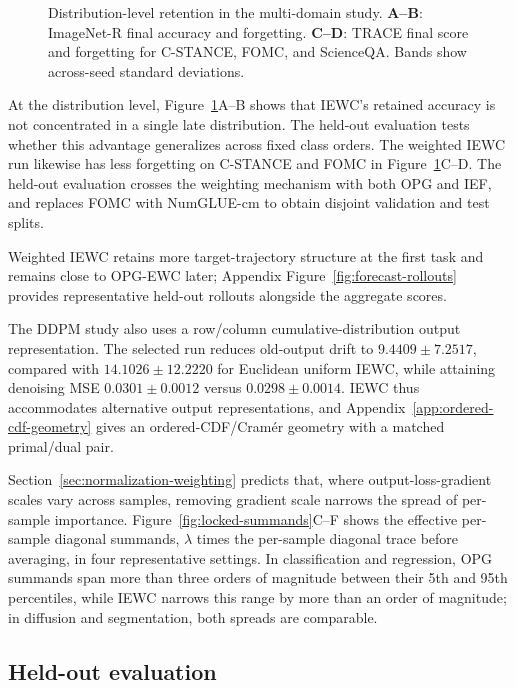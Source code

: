 \begin{figure}[t]
\centering

\caption[ImageNet-R and TRACE distribution retention]{Distribution-level retention in the multi-domain study. \textbf{A--B}: ImageNet-R final accuracy and forgetting. \textbf{C--D}: TRACE final score and forgetting for C-STANCE, FOMC, and ScienceQA. Bands show across-seed standard deviations.}
\label{fig:distribution-retention}
\end{figure}

At the distribution level, Figure~\ref{fig:distribution-retention}A--B shows that IEWC's retained accuracy is not concentrated in a single late distribution. The held-out evaluation tests whether this advantage generalizes across fixed class orders. The weighted IEWC run likewise has less forgetting on C-STANCE and FOMC in Figure~\ref{fig:distribution-retention}C--D. The held-out evaluation crosses the weighting mechanism with both OPG and IEF, and replaces FOMC with NumGLUE-cm to obtain disjoint validation and test splits.


Weighted IEWC retains more target-trajectory structure at the first task and remains close to OPG-EWC later; Appendix Figure~\ref{fig:forecast-rollouts} provides representative held-out rollouts alongside the aggregate scores.

The DDPM study also uses a row/column cumulative-distribution output representation. The selected run reduces old-output drift to $9.4409\pm7.2517$, compared with $14.1026\pm12.2220$ for Euclidean uniform IEWC, while attaining denoising MSE $0.0301\pm0.0012$ versus $0.0298\pm0.0014$. IEWC thus accommodates alternative output representations, and Appendix~\ref{app:ordered-cdf-geometry} gives an ordered-CDF/Cram\'er geometry with a matched primal/dual pair.

Section~\ref{sec:normalization-weighting} predicts that, where output-loss-gradient scales vary across samples, removing gradient scale narrows the spread of per-sample importance. Figure~\ref{fig:locked-summands}C--F shows the effective per-sample diagonal summands, $\lambda$ times the per-sample diagonal trace before averaging, in four representative settings. In classification and regression, OPG summands span more than three orders of magnitude between their 5th and 95th percentiles, while IEWC narrows this range by more than an order of magnitude; in diffusion and segmentation, both spreads are comparable.

\subsection{Held-out evaluation}

